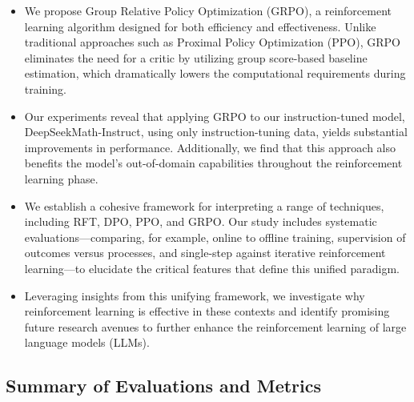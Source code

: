 \begin{itemize}[topsep=0pt]
    \item We propose Group Relative Policy Optimization (GRPO), a reinforcement learning algorithm designed for both efficiency and effectiveness. Unlike traditional approaches such as Proximal Policy Optimization (PPO), GRPO eliminates the need for a critic by utilizing group score-based baseline estimation, which dramatically lowers the computational requirements during training.
    \item Our experiments reveal that applying GRPO to our instruction-tuned model, DeepSeekMath-Instruct, using only instruction-tuning data, yields substantial improvements in performance. Additionally, we find that this approach also benefits the model's out-of-domain capabilities throughout the reinforcement learning phase.
    \item We establish a cohesive framework for interpreting a range of techniques, including RFT, DPO, PPO, and GRPO. Our study includes systematic evaluations—comparing, for example, online to offline training, supervision of outcomes versus processes, and single-step against iterative reinforcement learning—to elucidate the critical features that define this unified paradigm.
    \item Leveraging insights from this unifying framework, we investigate why reinforcement learning is effective in these contexts and identify promising future research avenues to further enhance the reinforcement learning of large language models (LLMs).
\end{itemize}

\subsection{Summary of Evaluations and Metrics}

